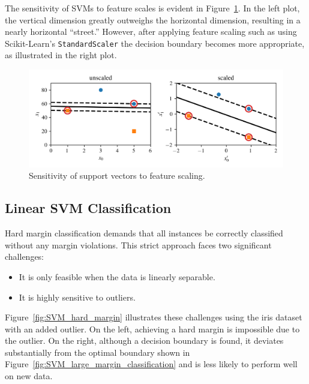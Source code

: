 \documentclass[12pt,letter]{article}
\begin{document}
\begin{mdframed}[middlelinewidth=0.5mm]
\begin{center}
\end{center}
The sensitivity of SVMs to feature scales is evident in Figure~\ref{fig:SVM_feature_scaling}. In the left plot, the vertical dimension greatly outweighs the horizontal dimension, resulting in a nearly horizontal ``street.'' However, after applying feature scaling such as using Scikit-Learn's \texttt{StandardScaler} the decision boundary becomes more appropriate, as illustrated in the right plot.

\begin{figure}[H]
	\centering
	\includegraphics[width=6.0in]{../figures/SVM_feature_scaling}
	\caption{Sensitivity of support vectors to feature scaling. }
	\label{fig:SVM_feature_scaling}
\end{figure}

\end{mdframed}




\subsection{Linear SVM Classification}


Hard margin classification demands that all instances be correctly classified without any margin violations. This strict approach faces two significant challenges:
\begin{itemize}
    \item It is only feasible when the data is linearly separable.
    \item It is highly sensitive to outliers.
\end{itemize}
Figure~\ref{fig:SVM_hard_margin} illustrates these challenges using the iris dataset with an added outlier. On the left, achieving a hard margin is impossible due to the outlier. On the right, although a decision boundary is found, it deviates substantially from the optimal boundary shown in Figure~\ref{fig:SVM_large_margin_classification} and is less likely to perform well on new data.
\end{document}

